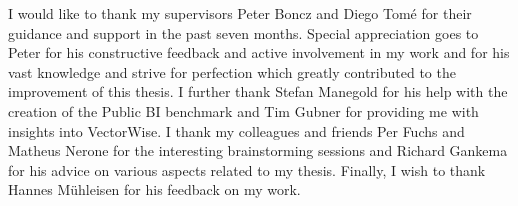

\begin{acknowledgements}      %

I would like to thank my supervisors Peter Boncz and Diego Tomé for their guidance and support in the past seven months. Special appreciation goes to Peter for his constructive feedback and active involvement in my work and for his vast knowledge and strive for perfection which greatly contributed to the improvement of this thesis. I further thank Stefan Manegold for his help with the creation of the Public BI benchmark and Tim Gubner for providing me with insights into VectorWise. I thank my colleagues and friends Per Fuchs and Matheus Nerone for the interesting brainstorming sessions and Richard Gankema for his advice on various aspects related to my thesis. Finally, I wish to thank Hannes Mühleisen for his feedback on my work.

\end{acknowledgements}



